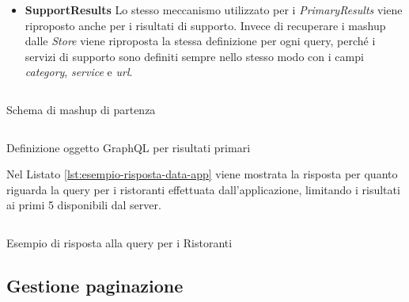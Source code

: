 \begin{itemize}
	\item \textbf{SupportResults} Lo stesso meccanismo utilizzato per i \emph{PrimaryResults} viene riproposto anche per i risultati di supporto. Invece di recuperare i mashup dalle \emph{Store} viene riproposta la stessa definizione per ogni query, perché i servizi di supporto sono definiti sempre nello stesso modo con i campi \emph{category}, \emph{service} e \emph{url}.
\end{itemize}

\begin{listing}[H]
	\inputminted{json}{6-implementazione-app/Codice/mashup-schema-app.json}
	\caption{Schema di mashup di partenza}
	\label{lst:esempio-data-mashup}
\end{listing}

\begin{listing}[H]
	\inputminted{text}{6-implementazione-app/Codice/esempio-query-primary-app.txt}
	\caption{Definizione oggetto GraphQL per risultati primari}
	\label{lst:esempio-primary-app}
\end{listing}

Nel Listato \ref{lst:esempio-risposta-data-app} viene mostrata la risposta per quanto riguarda la query per i ristoranti effettuata dall'applicazione, limitando i risultati ai primi 5 disponibili dal server. 

\begin{listing}[H]
	\inputminted{json}{6-implementazione-app/Codice/esempio-risposta-data-app.json}
	\caption{Esempio di risposta alla query per i Ristoranti}
	\label{lst:esempio-risposta-data-app}
\end{listing}

\subsection{Gestione paginazione}\label{sec:paginazione-app}

